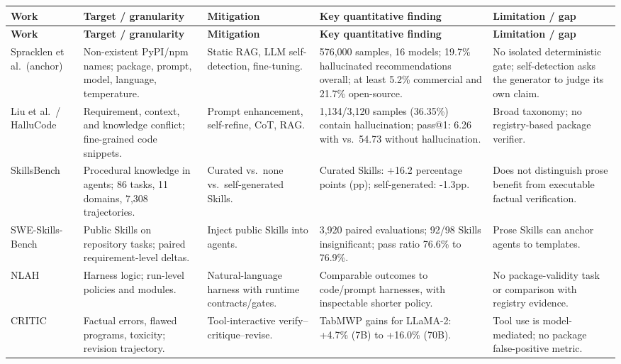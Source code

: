 \documentclass[11pt,a4paper]{article}
\begin{document}
\footnotesize
\begin{longtable}{p{2.1cm}p{2.6cm}p{2.4cm}p{3.0cm}p{2.5cm}}
\toprule
\textbf{Work} & \textbf{Target / granularity} & \textbf{Mitigation} & \textbf{Key quantitative finding} & \textbf{Limitation / gap}\\
\midrule
\endfirsthead
\toprule
\textbf{Work} & \textbf{Target / granularity} & \textbf{Mitigation} & \textbf{Key quantitative finding} & \textbf{Limitation / gap}\\
\midrule
\endhead
Spracklen et al.\ (anchor) & Non-existent PyPI/npm names; package, prompt, model, language, temperature. & Static RAG, LLM self-detection, fine-tuning. & 576,000 samples, 16 models; 19.7\% hallucinated recommendations overall; at least 5.2\% commercial and 21.7\% open-source. & No isolated deterministic gate; self-detection asks the generator to judge its own claim.\\
\addlinespace
Liu et al.\ / HalluCode & Requirement, context, and knowledge conflict; fine-grained code snippets. & Prompt enhancement, self-refine, CoT, RAG. & 1,134/3,120 samples (36.35\%) contain hallucination; pass@1: 6.26 with vs.\ 54.73 without hallucination. & Broad taxonomy; no registry-based package verifier.\\
\addlinespace
SkillsBench & Procedural knowledge in agents; 86 tasks, 11 domains, 7,308 trajectories. & Curated vs.\ none vs.\ self-generated Skills. & Curated Skills: +16.2 percentage points (pp); self-generated: -1.3pp. & Does not distinguish prose benefit from executable factual verification.\\
\addlinespace
SWE-Skills-Bench & Public Skills on repository tasks; paired requirement-level deltas. & Inject public Skills into agents. & 3,920 paired evaluations; 92/98 Skills insignificant; pass ratio 76.6\% to 76.9\%. & Prose Skills can anchor agents to templates.\\
\addlinespace
NLAH & Harness logic; run-level policies and modules. & Natural-language harness with runtime contracts/gates. & Comparable outcomes to code/prompt harnesses, with inspectable shorter policy. & No package-validity task or comparison with registry evidence.\\
\addlinespace
CRITIC & Factual errors, flawed programs, toxicity; revision trajectory. & Tool-interactive verify--critique--revise. & TabMWP gains for LLaMA-2: +4.7\% (7B) to +16.0\% (70B). & Tool use is model-mediated; no package false-positive metric.\\
\bottomrule
\end{longtable}
\normalsize
\end{document}
